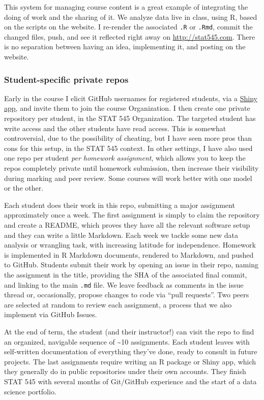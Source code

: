 \documentclass[12pt]{article}
\begin{document}
This system for managing course content is a great example of
integrating the doing of work and the sharing of it. We analyze data
live in class, using R, based on the scripts on the website. I re-render
the associated \texttt{.R} or \texttt{.Rmd}, commit the changed files,
push, and see it reflected right away on \url{http://stat545.com}. There
is no separation between having an idea, implementing it, and posting on
the website.

\subsubsection{Student-specific private
repos}\label{student-specific-private-repos}

Early in the course I elicit GitHub usernames for registered students,
via a \href{https://shiny.rstudio.com}{Shiny app}, and invite them to
join the course Organization. I then create one private repository per
student, in the STAT 545 Organization. The targeted student has write
access and the other students have read access. This is somewhat
controversial, due to the possibility of cheating, but I have seen more
pros than cons for this setup, in the STAT 545 context. In other
settings, I have also used one repo per student \emph{per homework
assignment}, which allows you to keep the repos completely private until
homework submission, then increase their visibility during marking and
peer review. Some courses will work better with one model or the other.

Each student does their work in this repo, submitting a major assignment
approximately once a week. The first assignment is simply to claim the
repository and create a README, which proves they have all the relevant
software setup and they can write a little Markdown. Each week we tackle
some new data analysis or wrangling task, with increasing latitude for
independence. Homework is implemented in R Markdown documents, rendered
to Markdown, and pushed to GitHub. Students submit their work by opening
an issue in their repo, naming the assignment in the title, providing
the SHA of the associated final commit, and linking to the main
\texttt{.md} file. We leave feedback as comments in the issue thread or,
occasionally, propose changes to code via ``pull requests''. Two peers
are selected at random to review each assignment, a process that we also
implement via GitHub Issues.

At the end of term, the student (and their instructor!) can visit the
repo to find an organized, navigable sequence of \textasciitilde{}10
assignments. Each student leaves with self-written documentation of
everything they've done, ready to consult in future projects. The last
assignments require writing an R package or Shiny app, which they
generally do in public repositories under their own accounts. They
finish STAT 545 with several months of Git/GitHub experience and the
start of a data science portfolio.
\end{document}
